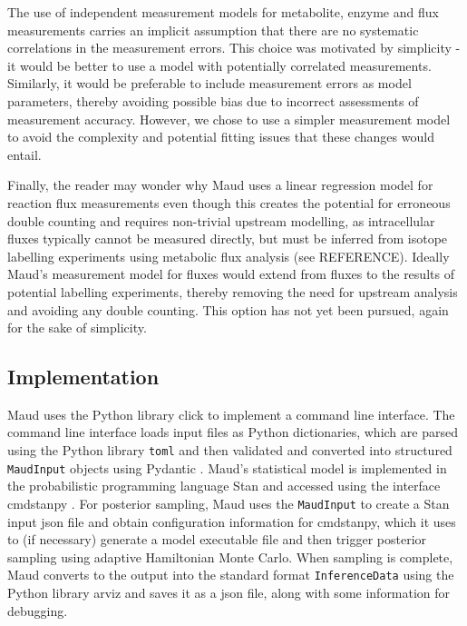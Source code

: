 \documentclass[journal=,manuscript=]{achemso}
\begin{document}
The use of independent measurement models for metabolite, enzyme and
flux measurements carries an implicit assumption that there are no
systematic correlations in the measurement errors. This choice was
motivated by simplicity - it would be better to use a model with
potentially correlated measurements. Similarly, it would be preferable
to include measurement errors as model parameters, thereby avoiding
possible bias due to incorrect assessments of measurement accuracy.
However, we chose to use a simpler measurement model to avoid the
complexity and potential fitting issues that these changes would entail.

Finally, the reader may wonder why Maud uses a linear regression model
for reaction flux measurements even though this creates the potential
for erroneous double counting and requires non-trivial upstream
modelling, as intracellular fluxes typically cannot be measured
directly, but must be inferred from isotope labelling experiments using
metabolic flux analysis (see REFERENCE). Ideally Maud's measurement
model for fluxes would extend from fluxes to the results of potential
labelling experiments, thereby removing the need for upstream analysis
and avoiding any double counting. This option has not yet been pursued,
again for the sake of simplicity.

\hypertarget{implementation}{%
\subsection{Implementation}\label{implementation}}

Maud uses the Python library click
\citep{clickdevelopersClickPythonComposable2022} to implement a command
line interface. The command line interface loads input files as Python
dictionaries, which are parsed using the Python library \texttt{toml}
\citep{pearsonTomlPythonLibrary2020} and then validated and converted
into structured \texttt{MaudInput} objects using Pydantic
\citep{pydanticdevelopersPydantic2022}. Maud's statistical model is
implemented in the probabilistic programming language Stan
\citep{carpenterStanProbabilisticProgramming2017} and accessed using the
interface cmdstanpy \citep{standevelopmentteamCmdStanPy2022}. For
posterior sampling, Maud uses the \texttt{MaudInput} to create a Stan
input json file and obtain configuration information for cmdstanpy,
which it uses to (if necessary) generate a model executable file and
then trigger posterior sampling using adaptive Hamiltonian Monte Carlo.
When sampling is complete, Maud converts to the output into the standard
format \texttt{InferenceData} using the Python library arviz
\citep{kumarArviZUnifiedLibrary2019} and saves it as a json file, along
with some information for debugging.
\end{document}
